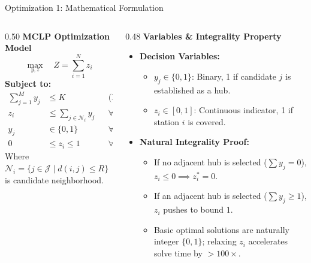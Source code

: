 \documentclass[aspectratio=169,10pt]{beamer}
\begin{document}
\begin{frame}{Optimization 1: Mathematical Formulation}
  \vspace{0.15cm}
  \begin{columns}[T]
    \begin{column}{0.50\textwidth}
      \textbf{\color{Navy}MCLP Optimization Model}
      $$\max_{y, z} \quad Z = \sum_{i=1}^{N} z_i$$
      \textbf{Subject to:}
      \begin{align*}
        \sum_{j=1}^{M} y_j &\le K && \text{(Hub Budget)} \\
        z_i &\le \sum_{j \in \mathcal{N}_i} y_j && \forall i \in \{1,\dots,N\} \\
        y_j &\in \{0, 1\} && \forall j \in \{1,\dots,M\} \\
        0 &\le z_i \le 1 && \forall i \in \{1,\dots,N\}
      \end{align*}
      {\scriptsize Where $\mathcal{N}_i = \{j \in \mathcal{J} \mid d(i, j) \le R\}$ is candidate neighborhood.}
    \end{column}
    \begin{column}{0.48\textwidth}
      \textbf{\color{Blue}Variables \& Integrality Property}
      \begin{itemize}\setlength{\itemsep}{0.15cm}
        \item \textbf{Decision Variables:}
          \begin{itemize}\setlength{\itemsep}{0.08cm}
            \item $y_j \in \{0, 1\}$: Binary, 1 if candidate $j$ is established as a hub.
            \item $z_i \in [0, 1]$: Continuous indicator, 1 if station $i$ is covered.
          \end{itemize}
        \item \textbf{Natural Integrality Proof:}
          \begin{itemize}\setlength{\itemsep}{0.08cm}
            \item If no adjacent hub is selected ($\sum y_j = 0$), $z_i \le 0 \implies z_i^* = 0$.
            \item If an adjacent hub is selected ($\sum y_j \ge 1$), $z_i$ pushes to bound $1$.
            \item Basic optimal solutions are naturally integer $\{0, 1\}$; relaxing $z_i$ accelerates solve time by $>100\times$.
          \end{itemize}
      \end{itemize}
    \end{column}
  \end{columns}
\end{frame}
\end{document}
